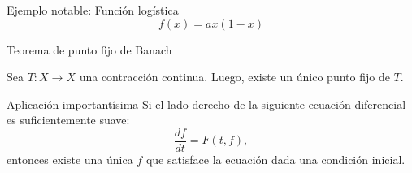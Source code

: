 \documentclass[12pt,aspectratio=169,xcolor=dvipsnames]{beamer}
\begin{document}
\begin{frame}{Ejemplo notable: Función logística}
    $$ f(x) = ax (1-x) $$
\end{frame}
\begin{frame}{Teorema de punto fijo de Banach}
    \begin{block}{}
        Sea $T:X\to X$ una contracción continua. Luego, existe un único punto fijo de $T$. 
    \end{block}
\end{frame}
\begin{frame}{Aplicación importantísima}
    Si el lado derecho de la siguiente ecuación diferencial es suficientemente suave: 
        $$ \frac{d f }{dt} = F(t, f), $$
    entonces existe una única $f$ que satisface la ecuación dada una condición inicial. 
\end{frame}
\begin{frame}
    \maketitle
\end{frame}
\end{document}
